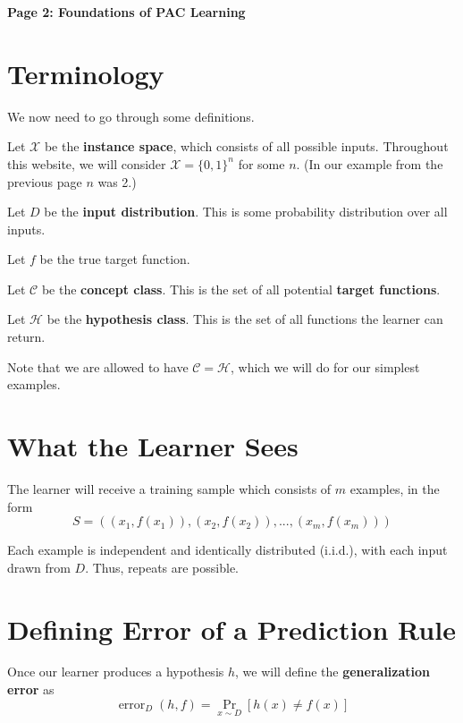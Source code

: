 \documentclass[11pt,fleqn]{article}
\newcommand{\X}{\mathcal X}
\newcommand{\C}{\mathcal C}
\newcommand{\Hy}{\mathcal H}
\newcommand{\err}{\operatorname{error}}
\begin{document}
\raggedright
\setlength{\parskip}{0.6em}

{\LARGE\bfseries Page 2: Foundations of PAC Learning\par}
\medskip

\section{Terminology}

We now need to go through some definitions.\par

Let $\X$ be the \textbf{instance space}, which consists of all possible inputs. Throughout this website, we will consider $\X = \{0, 1\}^n$ for some $n$. (In our example from the previous page $n$ was 2.)\par

Let $D$ be the \textbf{input distribution}. This is some probability distribution over all inputs.\par

Let $f$ be the true target function.\par

Let $\C$ be the \textbf{concept class}. This is the set of all potential \textbf{target functions}.\par

Let $\Hy$ be the \textbf{hypothesis class}. This is the set of all functions the learner can return.\par

Note that we are allowed to have $\C = \Hy$, which we will do for our simplest examples.\par

\section{What the Learner Sees}

The learner will receive a training sample which consists of $m$ examples, in the form
\[S = ((x_1, f(x_1)), (x_2, f(x_2)), ..., (x_m, f(x_m))) \]

Each example is independent and identically distributed (i.i.d.), with each input drawn from $D$. Thus, repeats are possible.

\section{Defining Error of a Prediction Rule}

Once our learner produces a hypothesis $h$, we will define the \textbf{generalization error} as
\[\boxed{\err_D(h, f) = \Pr_{x\sim D}[h(x) \neq f(x)]}\]
\end{document}
